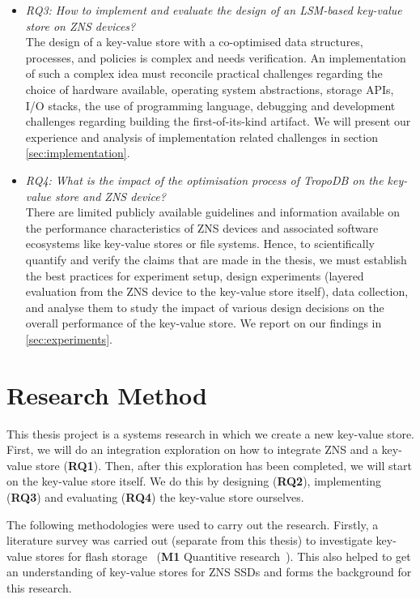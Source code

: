 \begin{itemize}
    \item \textit{RQ3: How to implement and evaluate the design of an LSM-based key-value store on ZNS devices?}\\
    The design of a key-value store with a co-optimised data structures, processes, and policies is complex and needs verification. An implementation of such a complex idea must reconcile practical challenges regarding the choice of hardware available, operating system abstractions, storage APIs, I/O stacks, the use of programming language, debugging and development challenges regarding building the first-of-its-kind artifact. We will present our experience and analysis of implementation related challenges in section \autoref{sec:implementation}.
    \item \textit{RQ4: What is the impact of the optimisation process of TropoDB on the key-value store and ZNS device?}\\ There are limited publicly available guidelines and information available on the performance characteristics of ZNS devices and associated software ecosystems like key-value stores or file systems. Hence, to scientifically quantify and verify the claims that are made in the thesis, we must establish the best practices for experiment setup, design experiments (layered evaluation from the ZNS device to the key-value store itself), data collection, and analyse them to study the impact of various design decisions on the overall performance of the key-value store. We report on our findings in \autoref{sec:experiments}.
\end{itemize}

\section{Research Method}
This thesis project is a systems research in which we create a new key-value store.
First, we will do an integration exploration on how to integrate ZNS and a key-value store (\textbf{RQ1}). Then, after this exploration has been completed, we will start on the key-value store itself. We do this by designing (\textbf{RQ2}), implementing (\textbf{RQ3}) and evaluating (\textbf{RQ4}) the key-value store ourselves.

The following methodologies were used to carry out the research. Firstly, a literature survey was carried out (separate from this thesis) to investigate key-value stores for flash storage~\cite{doekemeijer2022key} (\textbf{M1} Quantitive research~\cite{kheir2018systems, levy2006systems}). This also helped to get an understanding of key-value stores for ZNS SSDs and forms the background for this research.

